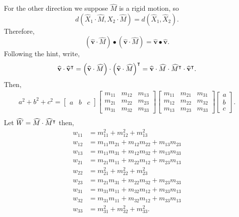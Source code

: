 \documentclass[newpage,hints,handout,12pt,noauthor,nooutcomes]{ximera}
\begin{document}
\begin{problem}
\begin{freeResponse}
For the other direction we suppose $\hat{M}$ is a rigid motion, so
\[
 d\left( \hat{X}_{1}  \cdot\hat{M},\hat{X}_{2}
   \cdot\hat{M}\right) = d\left(  \hat{X}_{1},\hat{X}_{2}\right).
\]
Therefore, 
\[
	\left(  \hat{\mathbf v}  \cdot\hat{M} \right) \bullet\left(
    \hat{\mathbf v}  \cdot\hat{M}\right)  =\hat{\mathbf v}\bullet\hat{\mathbf v}.
 \]
Following the hint, write,
\[
\widehat{\mathbf v}\cdot\widehat{\mathbf v}^\intercal= \left(  \widehat{\mathbf v}  \cdot\widehat{M} \right) \cdot\left(
    \widehat{\mathbf v}  \cdot\widehat{M}\right)^\intercal  = \widehat{\mathbf v} \cdot\widehat{M} \cdot \widehat{M}^\intercal \cdot \widehat{\mathbf v}^\intercal .
\]
Then, 
\begin{align*}
a^2 + b^2 +c^2
=
\begin{bmatrix}
      a & b & c
    \end{bmatrix}
\begin{bmatrix}
	m_{11} & m_{12} & m_{13}\\
	m_{21} & m_{22} & m_{23}\\
	m_{31} & m_{32} & m_{33}
\end{bmatrix}
\begin{bmatrix}
	m_{11} & m_{21} & m_{31}\\
	m_{12} & m_{22} & m_{32}\\
	m_{13} & m_{23} & m_{33}
\end{bmatrix}
\begin{bmatrix}
      a \\
      b \\
      c
    \end{bmatrix}. \\
 \end{align*}
 Let $\widehat{W} = \widehat{M} \cdot \widehat{M}^\intercal$ then,
 \begin{align*}
 w_{11} &= m_{11}^2 + m_{12}^2 +  m_{13}^2 \\
 w_{12} &= m_{11}m_{21} + m_{12}m_{22} +m_{13}m_{23}\\
 w_{13} &= m_{11}m_{31} + m_{12}m_{32} +m_{13}m_{33}\\
 w_{21} &= m_{21}m_{11} + m_{22}m_{12} +m_{23}m_{13} \\
 w_{22} &= m_{21}^2 + m_{22}^2 +  m_{23}^2 \\
 w_{23} &=  m_{21}m_{31} + m_{22}m_{32} +m_{23}m_{33} \\
 w_{31} &= m_{31}m_{11} + m_{32}m_{12} +m_{33}m_{13} \\
 w_{32} &= m_{31}m_{11} + m_{32}m_{12} +m_{33}m_{13}\\
 w_{33} &= m_{31}^2 + m_{32}^2 +  m_{33}^2.
 \end{align*}    
   

\end{freeResponse}
\end{problem}
\end{document}
